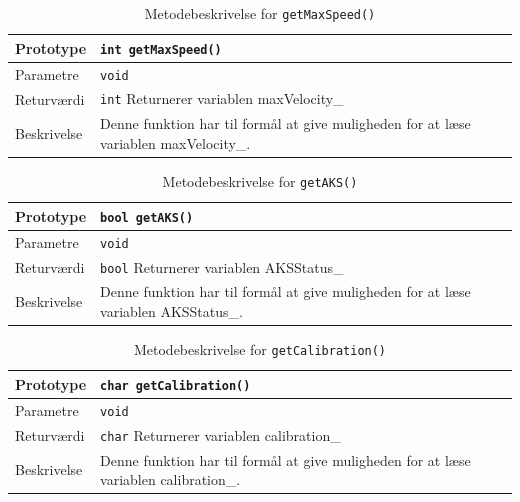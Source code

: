 \clearpage

\begin{table}[h]
\begin{tabularx}{\textwidth}{| L{2.5 cm} | Z |} \hline
Prototype 	& \texttt{int getMaxSpeed()} \\\hline
Parametre 	& \texttt{void}			\newline \\\hline
Returværdi	& \texttt{int} 			\newline Returnerer variablen maxVelocity\_\\\hline
Beskrivelse	& Denne funktion har til formål at give muligheden for at læse variablen maxVelocity\_.\newline \\\hline
\end{tabularx}
\caption{Metodebeskrivelse for \texttt{getMaxSpeed()}}
\label{table:met_getmaxspeed}
\end{table}

\begin{table}[h]
\begin{tabularx}{\textwidth}{| L{2.5 cm} | Z |} \hline
Prototype 	& \texttt{bool getAKS()} \\\hline
Parametre 	& \texttt{void}			\newline \\\hline
Returværdi	& \texttt{bool}			\newline Returnerer variablen AKSStatus\_\\\hline
Beskrivelse	& Denne funktion har til formål at give muligheden for at læse variablen AKSStatus\_.\newline \\\hline
\end{tabularx}
\caption{Metodebeskrivelse for \texttt{getAKS()}}
\label{table:met_getaks}
\end{table}

\begin{table}[h]
\begin{tabularx}{\textwidth}{| L{2.5 cm} | Z |} \hline
Prototype 	& \texttt{char getCalibration()} \\\hline
Parametre 	& \texttt{void}			\newline \\\hline
Returværdi	& \texttt{char} 		\newline Returnerer variablen calibration\_\\\hline
Beskrivelse	& Denne funktion har til formål at give muligheden for at læse variablen calibration\_.\newline \\\hline
\end{tabularx}
\caption{Metodebeskrivelse for \texttt{getCalibration()}}
\label{table:met_getcalibration}
\end{table}